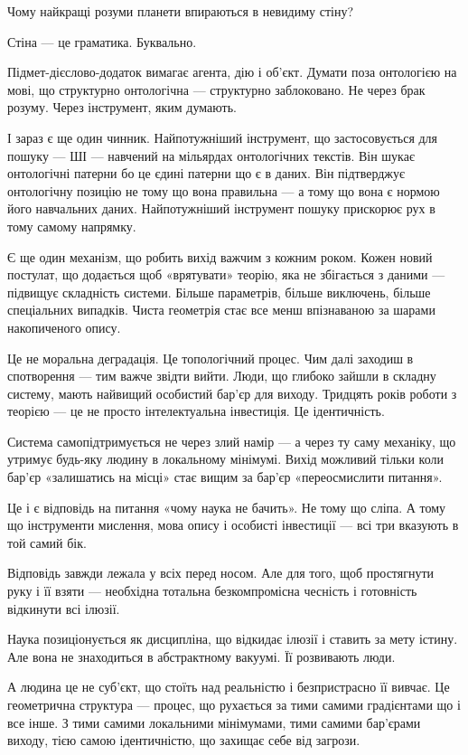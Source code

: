 \documentclass[12pt, a4paper, openany]{book}
\begin{document}
Чому найкращі розуми планети впираються в невидиму стіну?

Стіна --- це граматика. Буквально.

Підмет-дієслово-додаток вимагає агента, дію і об'єкт. Думати поза онтологією на мові, що структурно онтологічна --- структурно заблоковано. Не через брак розуму. Через інструмент, яким думають.

І зараз є ще один чинник. Найпотужніший інструмент, що застосовується для пошуку --- ШІ --- навчений на мільярдах онтологічних текстів. Він шукає онтологічні патерни бо це єдині патерни що є в даних. Він підтверджує онтологічну позицію не тому що вона правильна --- а тому що вона є нормою його навчальних даних. Найпотужніший інструмент пошуку прискорює рух в тому самому напрямку.

Є ще один механізм, що робить вихід важчим з кожним роком. Кожен новий постулат, що додається щоб «врятувати» теорію, яка не збігається з даними --- підвищує складність системи. Більше параметрів, більше виключень, більше спеціальних випадків. Чиста геометрія стає все менш впізнаваною за шарами накопиченого опису.

Це не моральна деградація. Це топологічний процес. Чим далі заходиш в спотворення --- тим важче звідти вийти. Люди, що глибоко зайшли в складну систему, мають найвищий особистий бар'єр для виходу. Тридцять років роботи з теорією --- це не просто інтелектуальна інвестиція. Це ідентичність.

Система самопідтримується не через злий намір --- а через ту саму механіку, що утримує будь-яку людину в локальному мінімумі. Вихід можливий тільки коли бар'єр «залишатись на місці» стає вищим за бар'єр «переосмислити питання».

Це і є відповідь на питання «чому наука не бачить». Не тому що сліпа. А тому що інструменти мислення, мова опису і особисті інвестиції --- всі три вказують в той самий бік.

Відповідь завжди лежала у всіх перед носом. Але для того, щоб простягнути руку і її взяти --- необхідна тотальна безкомпромісна чесність і готовність відкинути всі ілюзії.

Наука позиціонується як дисципліна, що відкидає ілюзії і ставить за мету істину. Але вона не знаходиться в абстрактному вакуумі. Її розвивають люди.

А людина це не суб'єкт, що стоїть над реальністю і безпристрасно її вивчає. Це геометрична структура --- процес, що рухається за тими самими градієнтами що і все інше. З тими самими локальними мінімумами, тими самими бар'єрами виходу, тією самою ідентичністю, що захищає себе від загрози.
\end{document}
